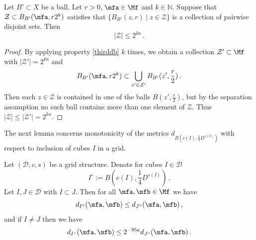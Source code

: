 \begin{lemma}
    \label{ball-metric-entropy}
    \leanok
    Let $B' \subset X$ be a ball. Let $r > 0$, $\mfa \in \Mf$ and $k \in \mathbb{N}$. Suppose that $\mathcal{Z} \subset B_{B'}(\mfa, r2^k)$ satisfies that $\{B_{B'}(z,r)\mid z \in \mathcal{Z}\}$ is a collection of pairwise disjoint sets. Then
    $$ |\mathcal{Z}| \le 2^{ka}\,. $$
\end{lemma}

\begin{proof}
    \leanok
    By applying property \eqref{thirddb} $k$ times, we obtain a collection $\mathcal{Z}' \subset \Mf$ with $|\mathcal{Z}'| = 2^{ka}$ and
    $$
        B_{B'}(\mfa,r2^k) \subset \bigcup_{z' \in \mathcal{Z}'} B_{B'}(z', \frac{r}{2})\,.
    $$
    Then each $z \in \mathcal{Z}$ is contained in one of the balls $B(z', \frac{r}{2})$, but by the separation assumption no such ball contains more than one element of $\mathcal{Z}$. Thus $|\mathcal{Z}| \le |\mathcal{Z}'| = 2^{ka}$.
\end{proof}

The next lemma concerns monotonicity of the metrics $d_{B(c(I), \frac 14 D^{s(I)})}$ with respect to inclusion of cubes $I$ in a grid.

\begin{lemma}
    \label{monotone-cube-metrics}
    \leanok
    Let $(\mathcal{D}, c, s)$ be a grid structure. Denote for cubes $I \in \mathcal{D}$
    $$
        I^\circ := B(c(I), \frac{1}{4} D^{s(I)})\,.
    $$
    Let $I, J \in \mathcal{D}$ with $I \subset J$.
    Then for all $\mfa, \mfb \in\Mf$ we have
    $$
        d_{I^\circ}(\mfa, \mfb) \le d_{J^\circ}(\mfa, \mfb)\,,
    $$
    and if $I \ne J$ then we have
    $$
        d_{I^\circ}(\mfa, \mfb) \le 2^{-95a} d_{J^\circ}(\mfa, \mfb)\,.
    $$
\end{lemma}

